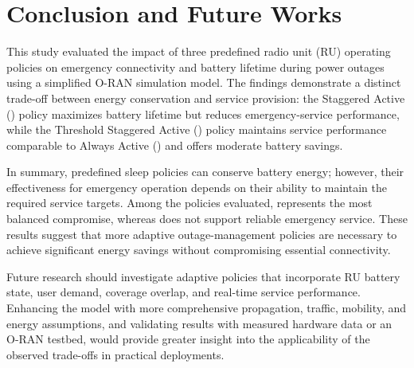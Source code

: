 \section{Conclusion and Future Works}

This study evaluated the impact of three predefined radio unit (RU) operating policies on emergency connectivity and battery lifetime during power outages using a simplified O-RAN simulation model. The findings demonstrate a distinct trade-off between energy conservation and service provision: the Staggered Active () policy maximizes battery lifetime but reduces emergency-service performance, while the Threshold Staggered Active () policy maintains service performance comparable to Always Active () and offers moderate battery savings.

In summary, predefined sleep policies can conserve battery energy; however, their effectiveness for emergency operation depends on their ability to maintain the required service targets. Among the policies evaluated,  represents the most balanced compromise, whereas  does not support reliable emergency service. These results suggest that more adaptive outage-management policies are necessary to achieve significant energy savings without compromising essential connectivity.

Future research should investigate adaptive policies that incorporate RU battery state, user demand, coverage overlap, and real-time service performance. Enhancing the model with more comprehensive propagation, traffic, mobility, and energy assumptions, and validating results with measured hardware data or an O-RAN testbed, would provide greater insight into the applicability of the observed trade-offs in practical deployments.
